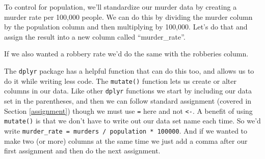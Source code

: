 \documentclass[
]{krantz}
\makeatletter
\newenvironment{Shaded}{\begin{snugshade}}{\end{snugshade}}
\newcommand{\DecValTok}[1]{\textcolor[rgb]{0.06,0.06,0.06}{#1}}
\newcommand{\NormalTok}[1]{#1}
\newcommand{\OtherTok}[1]{\textcolor[rgb]{0.37,0.37,0.37}{#1}}
\newcommand{\SpecialCharTok}[1]{\textcolor[rgb]{0,0,0}{#1}}
\newenvironment{kframe}{%
\medskip{}
\setlength{\fboxsep}{.8em}
 \def\at@end@of@kframe{}%
 \ifinner\ifhmode%
  \def\at@end@of@kframe{\end{minipage}}%
  \begin{minipage}{\columnwidth}%
 \fi\fi%
 \def\FrameCommand##1{\hskip\@totalleftmargin \hskip-\fboxsep
 \colorbox{shadecolor}{##1}\hskip-\fboxsep
     \hskip-\linewidth \hskip-\@totalleftmargin \hskip\columnwidth}%
 \MakeFramed {\advance\hsize-\width
   \@totalleftmargin\z@ \linewidth\hsize
   \@setminipage}}%
 {\par\unskip\endMakeFramed%
 \at@end@of@kframe}
\renewenvironment{Shaded}{\begin{kframe}}{\end{kframe}}
\makeatother
\begin{document}
To control for population, we'll standardize our murder data
by creating a murder rate per 100,000 people. We can do this
by dividing the murder column by the population column and
then multiplying by 100,000. Let's do that and assign the
result into a new column called ``murder\_rate''.

\begin{Shaded}
\end{Shaded}

If we also wanted a robbery rate we'd do the same with the
robberies column.

\begin{Shaded}
\end{Shaded}

The \texttt{dplyr} package has a helpful function that can
do this too, and allows us to do it while writing less code.
The \texttt{mutate()} function lets us create or alter
columns in our data. Like other \texttt{dplyr} functions we
start by including our data set in the parentheses, and then
we can follow standard assignment (covered in Section
\ref{assignment}) though we must use \texttt{=} here and not
\texttt{\textless{}-}. A benefit of using \texttt{mutate()}
is that we don't have to write out our data set name each
time. So we'd write
\texttt{murder\_rate\ =\ murders\ /\ population\ *\ 100000}.
And if we wanted to make two (or more) columns at the same
time we just add a comma after our first assignment and then
do the next assignment.
\end{document}

